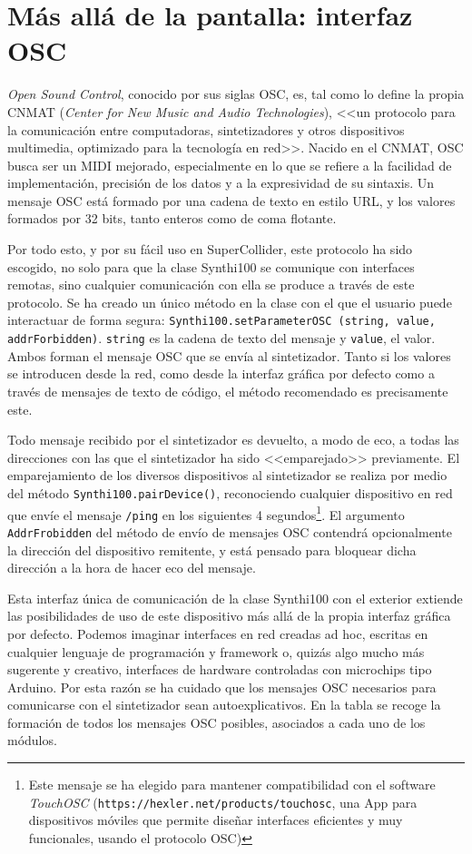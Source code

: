 \section{Más allá de la pantalla: interfaz OSC}

\textit{Open Sound Control}, conocido por sus siglas OSC, es, tal como lo define la propia CNMAT (\textit{Center for New Music and Audio Technologies}), <<un protocolo para la comunicación entre computadoras, sintetizadores y otros dispositivos multimedia, optimizado para la tecnología en red>>. Nacido en el CNMAT, OSC busca ser un MIDI mejorado, especialmente en lo que se refiere a la facilidad de implementación, precisión de los datos y a la expresividad de su sintaxis. Un mensaje OSC está formado por una cadena de texto en estilo URL, y los valores formados por 32 bits, tanto enteros como de coma flotante. 

Por todo esto, y por su fácil uso en SuperCollider, este protocolo ha sido escogido, no solo para que la clase Synthi100 se comunique con interfaces remotas, sino cualquier comunicación con ella se produce a través de este protocolo. Se ha creado un único método en la clase con el que el usuario puede interactuar de forma segura: \texttt{Synthi100.setParameterOSC (string, value, addrForbidden)}. \texttt{string} es la cadena de texto del mensaje y \texttt{value}, el valor. Ambos forman el mensaje OSC que se envía al sintetizador. Tanto si los valores se introducen desde la red, como desde la interfaz gráfica por defecto como a través de mensajes de texto de código, el método recomendado es precisamente este.

Todo mensaje recibido por el sintetizador es devuelto, a modo de eco, a todas las direcciones con las que el sintetizador ha sido <<emparejado>> previamente. El emparejamiento de los diversos dispositivos al sintetizador se realiza por medio del método \texttt{Synthi100.pairDevice()}, reconociendo cualquier dispositivo en red que envíe el mensaje \texttt{/ping} en los siguientes 4 segundos\footnote{Este mensaje se ha elegido para mantener compatibilidad con el software \textit{TouchOSC} (\texttt{https://hexler.net/products/touchosc}, una App para dispositivos móviles que permite diseñar interfaces eficientes y muy funcionales, usando el protocolo OSC)}. El argumento \texttt{AddrFrobidden} del método de envío de mensajes OSC contendrá opcionalmente la dirección del dispositivo remitente, y está pensado para bloquear dicha dirección a la hora de hacer eco del mensaje.

Esta interfaz única de comunicación de la clase Synthi100 con el exterior extiende las posibilidades de uso de este dispositivo más allá de la propia interfaz gráfica por defecto. Podemos imaginar interfaces en red creadas ad hoc, escritas en cualquier lenguaje de programación y framework o, quizás algo mucho más sugerente y creativo, interfaces de hardware controladas con microchips tipo Arduino. Por esta razón se ha cuidado que los mensajes OSC necesarios para comunicarse con el sintetizador sean autoexplicativos. En la tabla se recoge la formación de todos los mensajes OSC posibles, asociados a cada uno de los módulos.

